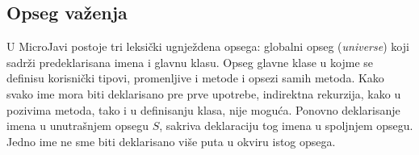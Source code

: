 \subsection*{Opseg važenja}

U MicroJavi postoje tri leksički ugnježdena opsega: globalni opseg (\textit{universe}) koji sadrži predeklarisana imena i glavnu klasu. Opseg glavne klase u kojme se definisu korisnički tipovi, promenljive i metode i opsezi samih metoda. Kako svako ime mora biti deklarisano pre prve upotrebe, indirektna rekurzija, kako u pozivima metoda, tako i u definisanju klasa, nije moguća. Ponovno deklarisanje imena u unutrašnjem opsegu $S$, sakriva deklaraciju tog imena u spoljnjem opsegu. Jedno ime ne sme biti deklarisano više puta u okviru istog opsega.
